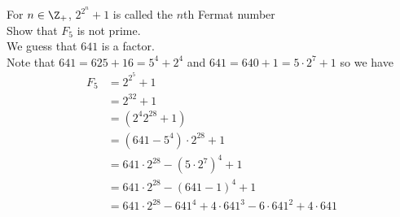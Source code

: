  For $n\in\Z_+$, $2^{2^n}+1$ is called the $n$th Fermat number \\
\eg Show that $F_5$ is not prime. \\
\soln We guess that $641$ is a factor. \\
Note that $641=625+16=5^4+2^4$ and $641=640+1=5\cdot2^7+1$ so we have
\begin{align*}
F_5 &= 2^{2^5}+1 \\
&= 2^{32} + 1 \\
&= (2^4 2^{28}+1) \\
&= (641-5^4)\cdot2^{28} + 1 \\
&= 641\cdot 2^{28} - (5\cdot2^7)^4 + 1 \\
&= 641\cdot 2^{28} - (641-1)^4 + 1 \\
&= 641\cdot 2^{28} - 641^4 + 4\cdot641^3 - 6\cdot641^2 + 4\cdot641
\end{align*}
